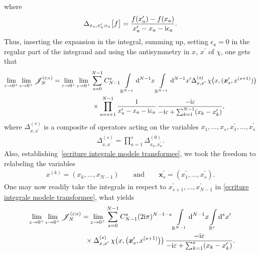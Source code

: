 \documentclass[pdftex]{sigma}%
\numberwithin{equation}{section}
\begin{document}
where
\begin{gather*}
\Delta_{x_a,x_a^{\prime}; \epsilon_a}\big[ f\big] = \frac{ f(x_a^{\prime})-f(x_a ) }{x^{\prime}_a-x_a-{\rm i} \epsilon_a } .
\end{gather*}
Thus, inserting the expansion in the integral, summing up, setting $\epsilon_a=0$ in the regular part of the integrand and using the
antisymmetry in $x$, $x^{\prime}$ of $\chi$, one gets that
\begin{gather}
 \lim_{\varepsilon\rightarrow 0^+} \lim_{ \epsilon \rightarrow 0^+ } \mathscr{J}_N^{(\varepsilon;\epsilon)} =
 \lim_{\varepsilon\rightarrow 0^+} \lim_{\epsilon \rightarrow 0^+ }
\sum_{s=0}^{N-1} C^{s}_{N-1}
 \int\limits_{\mathbb{R}^{N-1}}{} {\rm d}^{N-1}x \int\limits_{\mathbb{R}^{N-1}}{} {\rm d}^{N-1}x^{\prime} \Delta^{(s)}_{x,x^{\prime} } \,
\chi\big( x,(\boldsymbol{x}_s^{\prime},x^{(s+1)})\big) \nonumber
\\ \hphantom{ \lim_{\varepsilon\rightarrow 0^+} \lim_{ \epsilon \rightarrow 0^+ } \mathscr{J}_N^{(\varepsilon;\epsilon)} =}
\times \prod\limits_{a=s+1}^{N-1} \frac{1}{x^{\prime}_a-x_a-{\rm i} \varepsilon_a }
\, \frac{-{\rm i} \varepsilon }{-{\rm i} \varepsilon + \sum_{k=1}^{N-1}(x_k - x_k^{\prime}) },
\label{ecriture integrale modele transformee}
\end{gather}
where $\Delta^{(s)}_{x,x^{\prime} }$ is a composite of operators acting on the variables $x_1,\dots, x_s, x_1^{\prime},\dots,
x_{s}^{\prime}$
\begin{gather*}
\Delta^{(s)}_{x,x^{\prime} } = \prod\limits_{a=1}^{s} \Delta_{x_a,x_a^{\prime}}^{(0)} .
\end{gather*}
Also, establishing~\eqref{ecriture integrale modele transformee}, we took the freedom to relabeling the variables %
\begin{gather*}
x^{(k)} = (x_k,\dots, x_{N-1 } ) \qquad \text{and} \qquad \boldsymbol{x}_s^{\prime} =(x_1^{\prime},\dots, x_{s}^{\prime}).
\end{gather*}
One may now readily take the integrals in respect to $x^{\prime}_{s+1},\dots, x^{\prime}_{N-1}$ in \eqref{ecriture integrale modele
transformee}, what yields
\begin{gather*}
\lim_{\varepsilon\rightarrow 0^+} \lim_{\epsilon \rightarrow 0^+ }
 \mathscr{J}_N^{(\varepsilon;\epsilon)} = \lim_{\varepsilon\rightarrow 0^+}
\sum_{s=0}^{N-1} C^{s}_{N-1} (2 {\rm i}\pi)^{N-1-s}
\int\limits_{\mathbb{R}^{N-1}}{} {\rm d}^{N-1}x \int\limits_{\mathbb{R}^{s}}{} {\rm d}^{s}x^{\prime}
\\ \hphantom{\lim_{\varepsilon\rightarrow 0^+} \lim_{\epsilon \rightarrow 0^+ }
 \mathscr{J}_N^{(\varepsilon;\epsilon)} =}
\times \Delta^{(s)}_{x,x^{\prime} } \, \chi\big( x,\big(\boldsymbol{x}_s^{\prime},x^{(s+1)}\big)\big)
\, \frac{-{\rm i} \varepsilon }{-{\rm i} \varepsilon + \sum_{k=1}^{s}(x_k - x_k^{\prime}) }.
\end{gather*}
\end{document}

